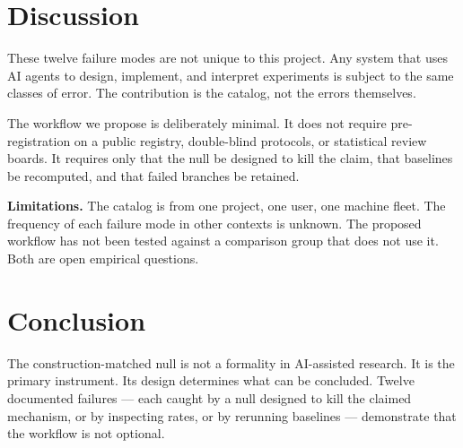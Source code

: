 \documentclass[11pt]{article}
\begin{document}
\section{Discussion}

These twelve failure modes are not unique to this project. Any system
that uses AI agents to design, implement, and interpret experiments is
subject to the same classes of error. The contribution is the catalog,
not the errors themselves.

The workflow we propose is deliberately minimal. It does not require
pre-registration on a public registry, double-blind protocols, or
statistical review boards. It requires only that the null be designed to
kill the claim, that baselines be recomputed, and that failed branches be
retained.

\textbf{Limitations.} The catalog is from one project, one user, one
machine fleet. The frequency of each failure mode in other contexts is
unknown. The proposed workflow has not been tested against a comparison
group that does not use it. Both are open empirical questions.

\section{Conclusion}

The construction-matched null is not a formality in AI-assisted research.
It is the primary instrument. Its design determines what can be
concluded. Twelve documented failures --- each caught by a null designed
to kill the claimed mechanism, or by inspecting rates, or by rerunning
baselines --- demonstrate that the workflow is not optional.
\end{document}
